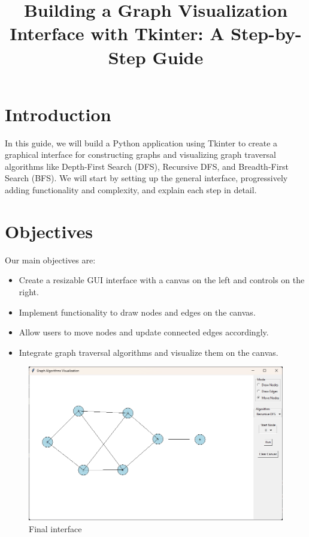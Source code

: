 \documentclass{article}
\title{Building a Graph Visualization Interface with Tkinter: A Step-by-Step Guide}
\author{}
\date{}
\begin{document}
\maketitle

\tableofcontents

\section{Introduction}

In this guide, we will build a Python application using Tkinter to create a graphical interface for constructing graphs and visualizing graph traversal algorithms like Depth-First Search (DFS), Recursive DFS, and Breadth-First Search (BFS). We will start by setting up the general interface, progressively adding functionality and complexity, and explain each step in detail.

\section{Objectives}

Our main objectives are:

\begin{itemize}
    \item Create a resizable GUI interface with a canvas on the left and controls on the right.
    \item Implement functionality to draw nodes and edges on the canvas.
    \item Allow users to move nodes and update connected edges accordingly.
    \item Integrate graph traversal algorithms and visualize them on the canvas.
\end{itemize}

\begin{figure}[h]
    \centering
    \includegraphics[width=0.8\linewidth]{images/final.png}
    \caption{Final interface}
    \label{fig:final_interface}
\end{figure}
\end{document}
